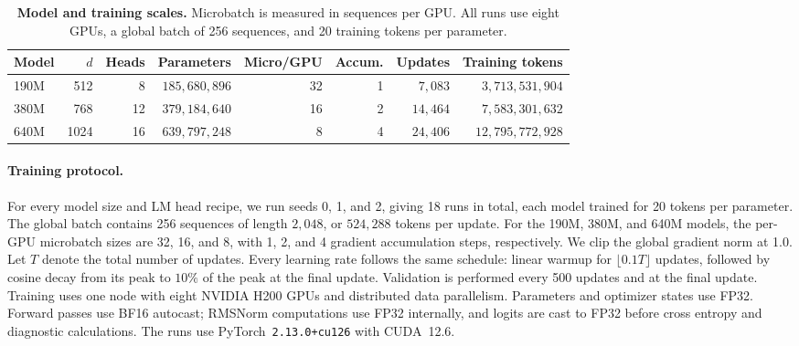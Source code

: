 \documentclass[anon]{opt2026} %
\begin{document}
\begin{table}[t]
\centering
\small
\setlength{\tabcolsep}{5pt}
\begin{tabular}{lrrrrrrr}
\toprule
Model & $d$ & Heads & Parameters & Micro/GPU & Accum. & Updates & Training tokens \\
\midrule
190M & 512  & 8  & $185{,}680{,}896$ & 32 & 1 & $7{,}083$  & $3{,}713{,}531{,}904$ \\
380M & 768  & 12 & $379{,}184{,}640$ & 16 & 2 & $14{,}464$ & $7{,}583{,}301{,}632$ \\
640M & 1024 & 16 & $639{,}797{,}248$ & 8  & 4 & $24{,}406$ & $12{,}795{,}772{,}928$ \\
\bottomrule
\end{tabular}
\caption{\textbf{Model and training scales.} Microbatch is measured in sequences per GPU. All runs use eight GPUs, a global batch of 256 sequences, and 20 training tokens per parameter.}
\label{tab:experiment-models}
\end{table}

\paragraph{Training protocol.}
For every model size and LM head recipe, we run seeds 0, 1, and 2, giving 18 runs in total, each model trained for 20 tokens per parameter. The global batch contains 256 sequences of length $2{,}048$, or $524{,}288$ tokens per update. For the 190M, 380M, and 640M models, the per-GPU microbatch sizes are 32, 16, and 8, with 1, 2, and 4 gradient accumulation steps, respectively. We clip the global gradient norm at 1.0. Let $T$ denote the total number of updates. Every learning rate follows the same schedule: linear warmup for $\lfloor 0.1T\rfloor$ updates, followed by cosine decay from its peak to $10\%$ of the peak at the final update. Validation is performed every 500 updates and at the final update. Training uses one node with eight NVIDIA H200 GPUs and distributed data parallelism. Parameters and optimizer states use FP32. Forward passes use BF16 autocast; RMSNorm computations use FP32 internally, and logits are cast to FP32 before cross entropy and diagnostic calculations. The runs use PyTorch~\texttt{2.13.0+cu126} with CUDA~12.6.
\end{document}
